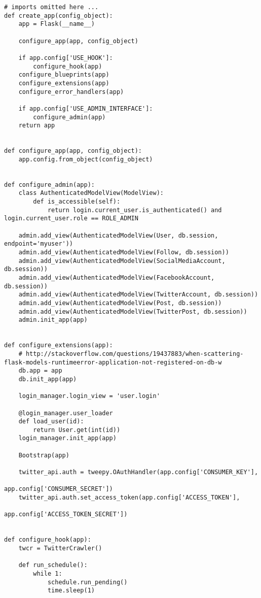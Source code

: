 \documentclass[../main/main.tex]{subfiles}
\begin{document}
\begin{lstlisting}
# imports omitted here ... 
def create_app(config_object):
    app = Flask(__name__)

    configure_app(app, config_object)

    if app.config['USE_HOOK']:
        configure_hook(app)
    configure_blueprints(app)
    configure_extensions(app)
    configure_error_handlers(app)

    if app.config['USE_ADMIN_INTERFACE']:
        configure_admin(app)
    return app


def configure_app(app, config_object):
    app.config.from_object(config_object)


def configure_admin(app):
    class AuthenticatedModelView(ModelView):
        def is_accessible(self):
            return login.current_user.is_authenticated() and login.current_user.role == ROLE_ADMIN

    admin.add_view(AuthenticatedModelView(User, db.session, endpoint='myuser'))
    admin.add_view(AuthenticatedModelView(Follow, db.session))
    admin.add_view(AuthenticatedModelView(SocialMediaAccount, db.session))
    admin.add_view(AuthenticatedModelView(FacebookAccount, db.session))
    admin.add_view(AuthenticatedModelView(TwitterAccount, db.session))
    admin.add_view(AuthenticatedModelView(Post, db.session))
    admin.add_view(AuthenticatedModelView(TwitterPost, db.session))
    admin.init_app(app)


def configure_extensions(app):
    # http://stackoverflow.com/questions/19437883/when-scattering-flask-models-runtimeerror-application-not-registered-on-db-w
    db.app = app
    db.init_app(app)

    login_manager.login_view = 'user.login'

    @login_manager.user_loader
    def load_user(id):
        return User.get(int(id))
    login_manager.init_app(app)

    Bootstrap(app)

    twitter_api.auth = tweepy.OAuthHandler(app.config['CONSUMER_KEY'],
                                           app.config['CONSUMER_SECRET'])
    twitter_api.auth.set_access_token(app.config['ACCESS_TOKEN'],
                                      app.config['ACCESS_TOKEN_SECRET'])


def configure_hook(app):
    twcr = TwitterCrawler()

    def run_schedule():
        while 1:
            schedule.run_pending()
            time.sleep(1)


\end{lstlisting}
\end{document}
